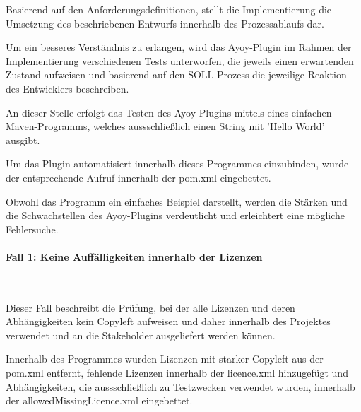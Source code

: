 Basierend auf den Anforderungsdefinitionen, stellt die Implementierung die Umsetzung des beschriebenen Entwurfs innerhalb des Prozessablaufs dar. 

Um ein besseres Verständnis zu erlangen, wird das Ayoy-Plugin im Rahmen der Implementierung verschiedenen Tests unterworfen, die jeweils einen erwartenden Zustand aufweisen und basierend auf den SOLL-Prozess die jeweilige Reaktion des Entwicklers beschreiben.

An dieser Stelle erfolgt das Testen des Ayoy-Plugins mittels eines einfachen Maven-Programms, welches aussschließlich einen String mit 'Hello World' ausgibt.

Um das Plugin automatisiert innerhalb dieses Programmes einzubinden, wurde der entsprechende Aufruf innerhalb der pom.xml eingebettet. 

Obwohl das Programm ein einfaches Beispiel darstellt, werden die Stärken und die Schwachstellen des Ayoy-Plugins verdeutlicht und erleichtert eine mögliche Fehlersuche. 

\paragraph{Fall 1: Keine Auffälligkeiten innerhalb der Lizenzen}$~$

Dieser Fall beschreibt die Prüfung, bei der alle Lizenzen und deren Abhängigkeiten kein Copyleft aufweisen und daher innerhalb des Projektes verwendet und an die Stakeholder ausgeliefert werden können. 

Innerhalb des Programmes wurden Lizenzen mit starker Copyleft aus der pom.xml entfernt, fehlende Lizenzen innerhalb der licence.xml hinzugefügt und Abhängigkeiten, die aussschließlich zu Testzwecken verwendet wurden, innerhalb der allowedMissingLicence.xml eingebettet.  

